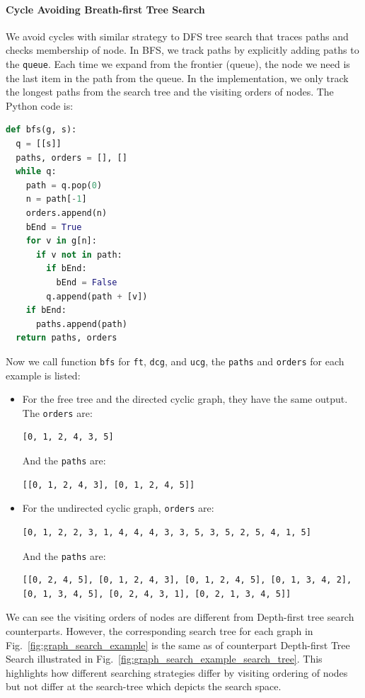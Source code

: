 \documentclass[main.tex]{subfiles}
\begin{document}
\paragraph{Cycle Avoiding Breath-first Tree Search} We avoid cycles with similar strategy to DFS tree search that traces paths and checks membership of node. In BFS, we track paths by explicitly adding paths to the \texttt{queue}. Each time we expand from the frontier (queue), the node we need is the last item in the path from the queue. In the implementation, we only track the longest paths from the search tree and the visiting orders of nodes. The Python code is:
\begin{lstlisting}[language=Python]
def bfs(g, s):
  q = [[s]]
  paths, orders = [], []
  while q:
    path = q.pop(0)
    n = path[-1]
    orders.append(n)
    bEnd = True
    for v in g[n]:
      if v not in path:
        if bEnd:
          bEnd = False
        q.append(path + [v])
    if bEnd:
      paths.append(path)
  return paths, orders
\end{lstlisting}
Now we call function \texttt{bfs} for \texttt{ft}, \texttt{dcg}, and \texttt{ucg}, the \texttt{paths} and \texttt{orders} for each example is listed:
\begin{itemize}
    \item For the free tree and the directed cyclic graph, they have the same output. The \texttt{orders} are:
\begin{lstlisting}[numbers=none]
[0, 1, 2, 4, 3, 5]
\end{lstlisting}
    And the \texttt{paths} are:
\begin{lstlisting}[numbers=none]
[[0, 1, 2, 4, 3], [0, 1, 2, 4, 5]]
\end{lstlisting}
    \item For the undirected cyclic graph, \texttt{orders} are:
\begin{lstlisting}[numbers=none]
[0, 1, 2, 2, 3, 1, 4, 4, 4, 3, 3, 5, 3, 5, 2, 5, 4, 1, 5]
\end{lstlisting}
    And the \texttt{paths} are:
\begin{lstlisting}[numbers=none]
[[0, 2, 4, 5], [0, 1, 2, 4, 3], [0, 1, 2, 4, 5], [0, 1, 3, 4, 2], [0, 1, 3, 4, 5], [0, 2, 4, 3, 1], [0, 2, 1, 3, 4, 5]]
\end{lstlisting}
\end{itemize}
We can see the visiting orders of nodes are different from Depth-first tree search counterparts. However, the corresponding search tree for each graph in Fig.~\ref{fig:graph_search_example} is the same as of counterpart Depth-first Tree Search illustrated in Fig.~\ref{fig:graph_search_example_search_tree}. This highlights how different searching strategies differ by visiting ordering of nodes but not differ at the search-tree which depicts the search space.  
\end{document}
